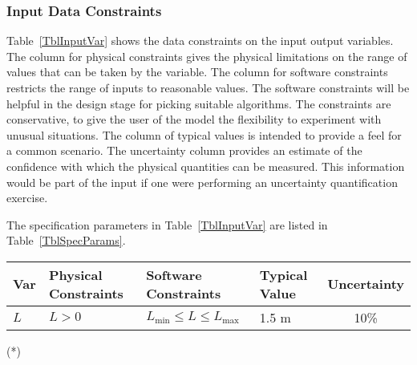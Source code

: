 \documentclass[12pt]{article}
\begin{document}

%

\subsubsection{Input Data Constraints} \label{sec_DataConstraints}

Table~\ref{TblInputVar} shows the data constraints on the input output
variables.  The column for physical constraints gives the physical limitations
on the range of values that can be taken by the variable.  The column for
software constraints restricts the range of inputs to reasonable values.  The
software constraints will be helpful in the design stage for picking suitable
algorithms.  The constraints are conservative, to give the user of the model the
flexibility to experiment with unusual situations.  The column of typical values
is intended to provide a feel for a common scenario.  The uncertainty column
provides an estimate of the confidence with which the physical quantities can be
measured.  This information would be part of the input if one were performing an
uncertainty quantification exercise.

The specification parameters in Table~\ref{TblInputVar} are listed in
Table~\ref{TblSpecParams}.

\begin{table}[!h]
  \caption{Input Variables} \label{TblInputVar}
  \renewcommand{\arraystretch}{1.2}
  \noindent \begin{longtable*}{l l l l c}
    \toprule
    \textbf{Var} & \textbf{Physical Constraints} & \textbf{Software Constraints} &
    \textbf{Typical Value} & \textbf{Uncertainty}\\
    \midrule
    $L$ & $L > 0$ & $L_{\text{min}} \leq L \leq L_{\text{max}}$ & 1.5 \si[per-mode=symbol] {\metre} & 10\%
    \\
    \bottomrule
  \end{longtable*}
\end{table}

\noindent
\begin{description}
  \item[(*)] 
\end{description}
\end{document}
